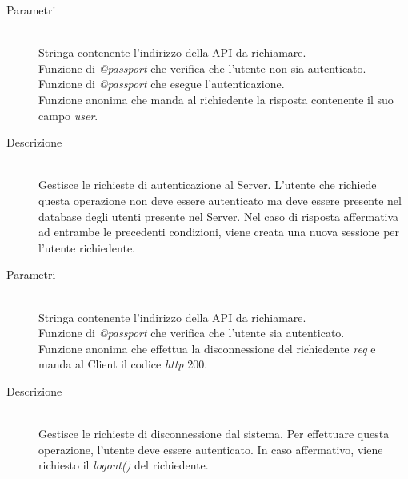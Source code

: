 \begin{description}
\begin{description}
\begin{mldescription}
 \begin{description}
  \item[Parametri]
   \begin{mldescription}
     \hfill \\
    Stringa contenente l'indirizzo della API da richiamare.
     \hfill \\
    Funzione di \textit{@passport} che verifica che l'utente non sia autenticato.
     \hfill \\
    Funzione di \textit{@passport} che esegue l'autenticazione.
     \hfill \\
    Funzione anonima che manda al richiedente la risposta contenente il suo campo \textit{user}.
   \end{mldescription}
  \item[Descrizione] \hfill \\
 Gestisce le richieste di autenticazione al Server. L'utente che richiede questa operazione non deve essere autenticato ma deve essere presente nel database degli utenti presente nel Server. Nel caso di risposta affermativa ad entrambe le precedenti condizioni, viene creata una nuova sessione per l'utente richiedente.
 \end{description}
 
 \begin{description}
  \item[Parametri]
   \begin{mldescription}
     \hfill \\
    Stringa contenente l'indirizzo della API da richiamare.
     \hfill \\
    Funzione di \textit{@passport} che verifica che l'utente sia autenticato.
     \hfill \\
    Funzione anonima che effettua la disconnessione del richiedente \textit{req} e manda al Client il codice \textit{http} 200.
   \end{mldescription}
  \item[Descrizione] \hfill \\
 Gestisce le richieste di disconnessione dal sistema. Per effettuare questa operazione, l'utente deve essere autenticato. In caso affermativo, viene richiesto il \textit{logout()} del richiedente.
 \end{description}
 

\end{mldescription}
\end{description}
\end{description}
